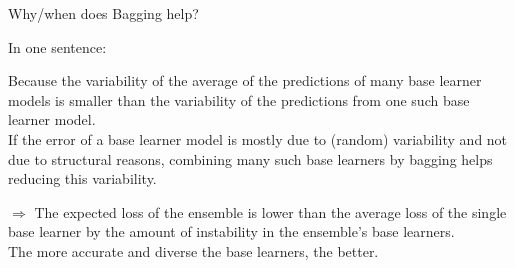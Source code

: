 \documentclass[11pt,compress,t,notes=noshow, xcolor=table]{beamer}
\begin{document}
\begin{vbframe}{Why/when does Bagging help?}

In one sentence:\\
\lz

Because the variability of the average of the predictions of many base learner models is smaller than the variability of the predictions from one such base learner model.\\

If the error of a base learner model is mostly due to (random) variability and not due to structural reasons, combining many such base learners by bagging helps reducing this variability.


\framebreak
{}
\small
$\Rightarrow$ The expected loss of the ensemble is lower than the average loss of the single base learner by the amount of instability in the ensemble's base learners.\\ The more accurate and diverse the base learners, the better.
\normalsize
\framebreak
\end{vbframe}
\end{document}
